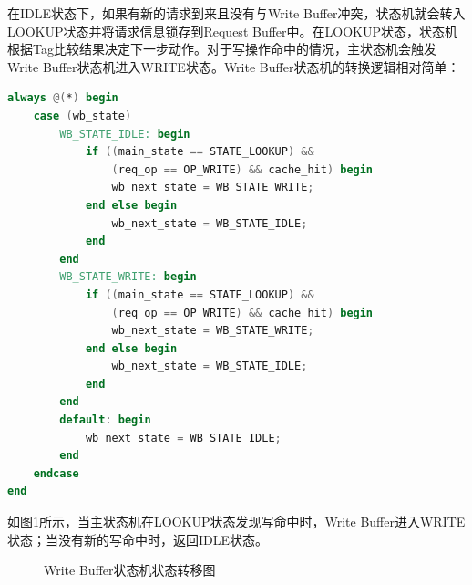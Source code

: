 \documentclass[11pt]{article}
\begin{document}
在IDLE状态下，如果有新的请求到来且没有与Write Buffer冲突，状态机就会转入LOOKUP状态并将请求信息锁存到Request Buffer中。在LOOKUP状态，状态机根据Tag比较结果决定下一步动作。对于写操作命中的情况，主状态机会触发Write Buffer状态机进入WRITE状态。Write Buffer状态机的转换逻辑相对简单：

\begin{lstlisting}[language=Verilog]
always @(*) begin
    case (wb_state)
        WB_STATE_IDLE: begin
            if ((main_state == STATE_LOOKUP) && 
                (req_op == OP_WRITE) && cache_hit) begin
                wb_next_state = WB_STATE_WRITE;
            end else begin
                wb_next_state = WB_STATE_IDLE;
            end
        end
        WB_STATE_WRITE: begin
            if ((main_state == STATE_LOOKUP) && 
                (req_op == OP_WRITE) && cache_hit) begin
                wb_next_state = WB_STATE_WRITE;
            end else begin
                wb_next_state = WB_STATE_IDLE;
            end
        end
        default: begin
            wb_next_state = WB_STATE_IDLE;
        end
    endcase
end
\end{lstlisting}

如图\ref{fig:wb_fsm}所示，当主状态机在LOOKUP状态发现写命中时，Write Buffer进入WRITE状态；当没有新的写命中时，返回IDLE状态。

\begin{figure}[H]
    \centering
    \caption{Write Buffer状态机状态转移图}
    \label{fig:wb_fsm}
\end{figure}
\end{document}
